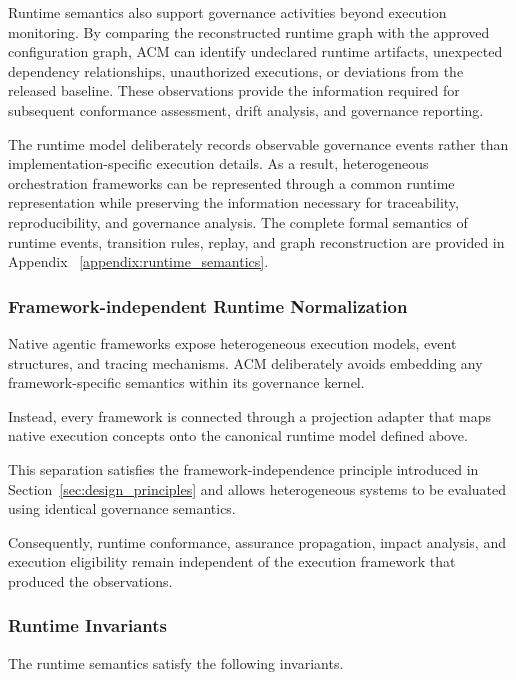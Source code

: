 \documentclass[10pt]{article}
\begin{document}
Runtime semantics also support governance activities beyond execution monitoring. By comparing the reconstructed runtime graph with the approved configuration graph, ACM can identify undeclared runtime artifacts, unexpected dependency relationships, unauthorized executions, or deviations from the released baseline. These observations provide the information required for subsequent conformance assessment, drift analysis, and governance reporting.

The runtime model deliberately records observable governance events rather than implementation-specific execution details. As a result, heterogeneous orchestration frameworks can be represented through a common runtime representation while preserving the information necessary for traceability, reproducibility, and governance analysis. The complete formal semantics of runtime events, transition rules, replay, and graph reconstruction are provided in Appendix ~\ref{appendix:runtime_semantics}.


\subsubsection{Framework-independent Runtime Normalization}

Native agentic frameworks expose heterogeneous execution models, event
structures, and tracing mechanisms. ACM deliberately avoids embedding any
framework-specific semantics within its governance kernel.

Instead, every framework is connected through a projection adapter that maps
native execution concepts onto the canonical runtime model defined above.

This separation satisfies the framework-independence principle introduced in
Section~\ref{sec:design_principles} and allows heterogeneous systems to be
evaluated using identical governance semantics.

Consequently, runtime conformance, assurance propagation, impact analysis,
and execution eligibility remain independent of the execution framework that
produced the observations.

\subsubsection{Runtime Invariants}

The runtime semantics satisfy the following invariants.
\end{document}

